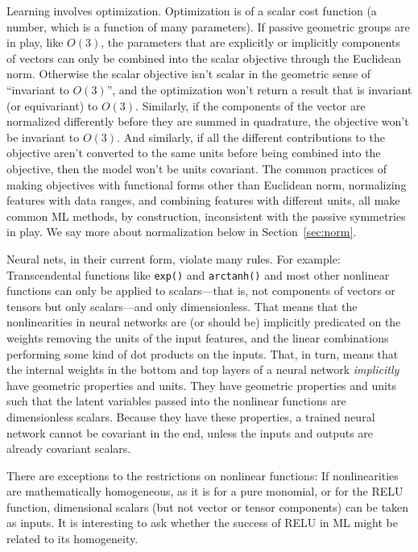 \documentclass{article} %
\newcommand{\sectionname}{Section}
\newcommand{\secref}[1]{\sectionname~\ref{#1}}
\begin{document}
Learning involves optimization.
Optimization is of a scalar cost function (a number, which is a function of many parameters).
If passive geometric groups are in play, like $O(3)$, the parameters that are explicitly or implicitly components of vectors can only be combined into the scalar objective through the Euclidean norm. Otherwise the scalar objective isn't scalar in the geometric sense of ``invariant to $O(3)$'', and the optimization won't return a result that is invariant (or equivariant) to $O(3)$.
Similarly, if the components of the vector are normalized differently before they are summed in quadrature, the objective won't be invariant to $O(3)$.
And similarly, if all the different contributions to the objective aren't converted to the same units before being combined into the objective, then the model won't be units covariant.
The common practices of making objectives with functional forms other than Euclidean norm, normalizing features with data ranges, and combining features with different units, all make common ML methods, by construction, inconsistent with the passive symmetries in play.
We say more about normalization below in \secref{sec:norm}.

Neural nets, in their current form, violate many rules. For example:
Transcendental functions like \texttt{exp()} and \texttt{arctanh()} and most other nonlinear functions can only be applied to scalars---that is, not components of vectors or tensors but only scalars---and only dimensionless.
That means that the nonlinearities in neural networks are (or should be) implicitly predicated on the weights removing the units of the input features, and the linear combinations performing some kind of dot products on the inputs.
That, in turn, means that the internal weights in the bottom and top layers of a neural network \emph{implicitly} have geometric properties and units.
They have geometric properties and units such that the latent variables passed into the nonlinear functions are dimensionless scalars.
Because they have these properties, a trained neural network cannot be covariant in the end, unless the inputs and outputs are already covariant scalars.

There are exceptions to the restrictions on nonlinear functions:
If nonlinearities are mathematically homogeneous, as it is for a pure monomial, or for the RELU function, dimensional scalars (but not vector or tensor components) can be taken as inputs.
It is interesting to ask whether the success of RELU in ML might be related to its homogeneity.
\end{document}
